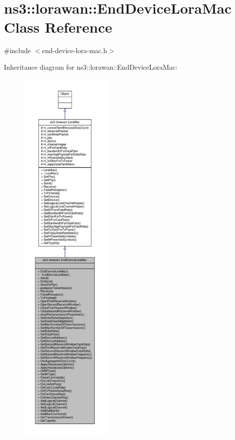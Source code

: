 \hypertarget{classns3_1_1lorawan_1_1EndDeviceLoraMac}{}\section{ns3\+:\+:lorawan\+:\+:End\+Device\+Lora\+Mac Class Reference}
\label{classns3_1_1lorawan_1_1EndDeviceLoraMac}


{\ttfamily \#include $<$end-\/device-\/lora-\/mac.\+h$>$}



Inheritance diagram for ns3\+:\+:lorawan\+:\+:End\+Device\+Lora\+Mac\+:
\nopagebreak
\begin{figure}[H]
\begin{center}
\leavevmode
\includegraphics[height=550pt]{classns3_1_1lorawan_1_1EndDeviceLoraMac__inherit__graph}
\end{center}
\end{figure}


